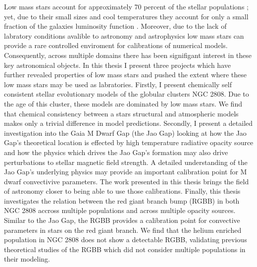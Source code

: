 Low mass stars account for approximately 70 percent of the stellar populations
\citep{Conroy2012}; yet, due to their small sizes and cool temperatures they
account for only a small fraction of the galaxies luminosity function
\citep{Laughlin1997}. Moreover, due to the lack of labratory conditions
avalible to astronomy and astrophysics low mass stars can provide a rare
controlled enviroment for calibrations of numerical models. Consequently,
across multiple domains there has been signifigant interest in these key
astronomical objects. In this thesis I present three projects which have
further revealed properties of low mass stars and pushed the extent where
these low mass stars may be used as labratories. Firstly, I present chemically
self consistent stellar evolutionary models of the globular clusters NGC 2808.
Due to the age of this cluster, these models are dominated by low mass stars.
We find that chemical consistency between a stars structural and atmospheric
models makes only a trivial difference in model predictions. Secondly, I
present a detailed investigation into the Gaia M Dwarf Gap (the Jao Gap)
looking at how the Jao Gap's theoretical location is effected by high
temperature radiative opacity source and how the physics which drives the Jao
Gap's formation may also drive perturbations to stellar magnetic field
strength. A detailed understanding of the Jao Gap's underlying physics may
provide an important calibration point for M dwarf convectivive parameters. The
work presented in this thesis brings the field of astronomy closer to being
able to use those calibrations. Finally, this thesis investigates the relation
between the red giant branch bump (RGBB) in both NGC 2808 accross multiple
populations and across multiple opacity sources. Similar to the Jao Gap, the
RGBB provides a calibration point for convective parameters in stars on the red
giant branch. We find that the helium enriched population in NGC 2808 does not
show a detectable RGBB, validating previous theoretical studies of the RGBB
which did not consider multiple populations in their modeling. 

